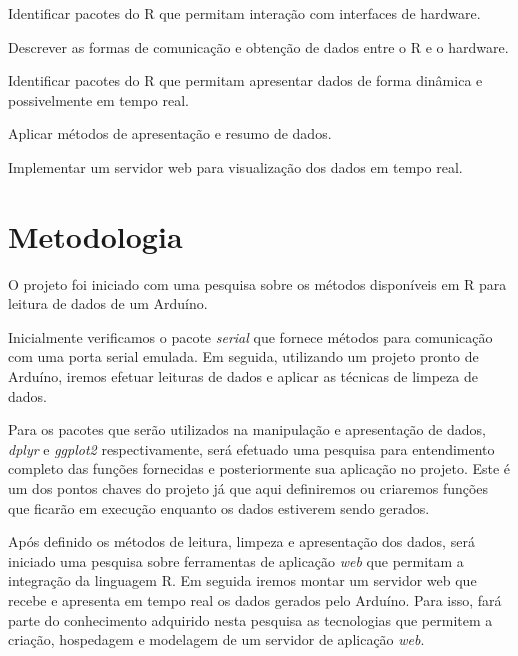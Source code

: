 \documentclass[
	article,			%
	11pt,				%
	oneside,			%
	a4paper,			%
	english,			%
	brazil,				%
	sumario=tradicional
	]{abntex2}
\begin{document}
\begin{alineas}
  
  \item Identificar pacotes do R que permitam interação com interfaces de hardware.
  \item Descrever as formas de comunicação e obtenção de dados entre o R e o hardware.
  \item Identificar pacotes do R que permitam apresentar dados de forma dinâmica e 
  possivelmente em tempo real.
  \item Aplicar métodos de apresentação e resumo de dados.
  \item Implementar um servidor web para visualização dos dados em tempo real.
  
\end{alineas}

\section[Metodologia]{Metodologia}

O projeto foi iniciado com uma pesquisa sobre os métodos disponíveis em R para 
leitura de dados de um Arduíno. 

Inicialmente verificamos o pacote 
\emph{serial} \cite{Seilmayer2017} que fornece métodos para comunicação com uma porta serial emulada. Em seguida, 
utilizando um projeto pronto de Arduíno, iremos efetuar leituras de dados e 
aplicar as técnicas de limpeza de dados. 

Para os pacotes que serão utilizados na manipulação e apresentação de dados, 
\emph{dplyr}\cite{Wickham2018} e \emph{ggplot2}\cite{Wickham2009} respectivamente, será efetuado uma pesquisa para 
entendimento completo das funções fornecidas e posteriormente sua aplicação no 
projeto. Este é um dos pontos chaves do projeto já que aqui definiremos ou 
criaremos funções que ficarão em execução enquanto os dados estiverem sendo 
gerados.

Após definido os métodos de leitura, limpeza e apresentação dos dados, será 
iniciado uma pesquisa sobre ferramentas de aplicação \emph{web} que permitam a 
integração da linguagem R. Em seguida iremos montar um servidor web que recebe e 
apresenta em tempo real os dados gerados pelo Arduíno. Para isso, fará parte do 
conhecimento adquirido nesta pesquisa as tecnologias que permitem a criação, 
hospedagem e modelagem de um servidor de aplicação \emph{web}.
\end{document}
